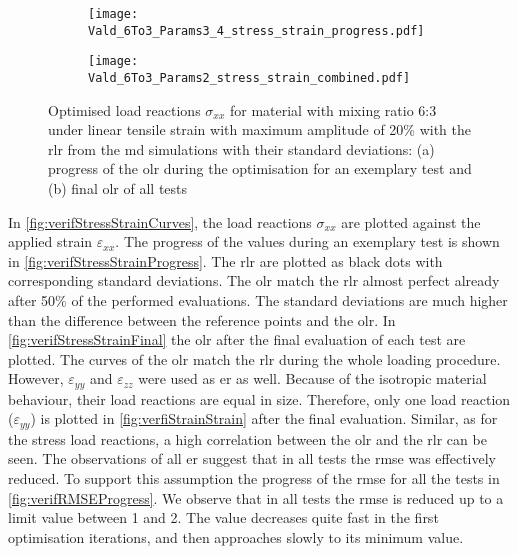 \begin{figure}[H]
\centering
\begin{subfigure}[t]{0.495\textwidth}
    \centering
    \texttt{[image: Vald\_6To3\_Params3\_4\_stress\_strain\_progress.pdf]}
    \caption{}
    \label{fig:verifStressStrainProgress}
\end{subfigure}
\hfill
\begin{subfigure}[t]{0.495\textwidth}
    \centering
    \texttt{[image: Vald\_6To3\_Params2\_stress\_strain\_combined.pdf]}
    \caption{}
    \label{fig:verifStressStrainFinal}
\end{subfigure}
\caption{Optimised load reactions $\sigma_{xx}$ for material with mixing ratio 6:3 under linear tensile strain with maximum amplitude of 20\% with the \acrfull{rlr} from the \acrshort{md} simulations with their standard deviations: (a) progress of the \acrlong{olr} during the optimisation for an exemplary test and (b) final \acrlong{olr} of all tests}
\label{fig:verifStressStrainCurves}
\end{figure}

In \autoref{fig:verifStressStrainCurves}, the load reactions $\sigma_{xx}$ are plotted against the applied strain $\varepsilon_{xx}$. The progress of the values during an exemplary test is shown in \autoref{fig:verifStressStrainProgress}. The \acrlong{rlr} are plotted as black dots with corresponding standard deviations. The \acrlong{olr} match the \acrlong{rlr} almost perfect already after 50\% of the performed evaluations. The standard deviations are much higher than the difference between the reference points and the \acrlong{olr}. In \autoref{fig:verifStressStrainFinal} the \acrlong{olr} after the final evaluation of each test are plotted.
The curves of the \acrlong{olr} match the \acrlong{rlr} during the whole loading procedure.
However, $\varepsilon_{yy}$ and $\varepsilon_{zz}$ were used as \acrlong{er} as well. Because of the isotropic material behaviour, their load reactions are equal in size. Therefore, only one load reaction ($\varepsilon_{yy}$) is plotted in \autoref{fig:verfiStrainStrain} after the final evaluation. Similar, as for the stress load reactions, a high correlation between the \acrlong{olr} and the \acrlong{rlr} can be seen. The observations of all \acrlong{er} suggest that in all tests the \acrshort{rmse} was effectively reduced. To support this assumption the progress of the \acrshort{rmse} for all the tests in \autoref{fig:verifRMSEProgress}. We observe that in all tests the \acrshort{rmse} is reduced up to a limit value between 1 and 2. The value decreases quite fast in the first optimisation iterations, and then approaches slowly to its minimum value.

